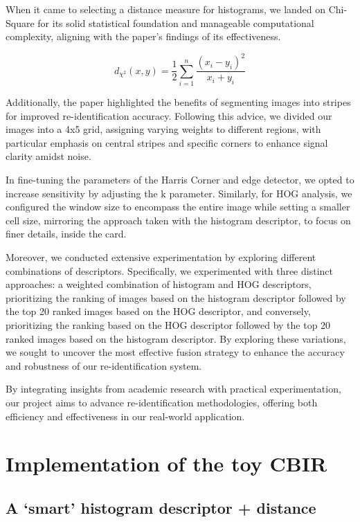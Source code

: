 \documentclass[12pt]{article}
\begin{document}
When it came to selecting a distance measure for histograms, we landed on Chi-Square for its solid statistical foundation and manageable computational complexity, aligning with the paper's findings of its effectiveness.

\begin{equation*}
    d_{\chi^2}(x, y) = \frac{1}{2}\sum_{i = 1}^n \frac{\left(x_i - y_i\right)^2}{x_i + y_i}
\end{equation*}

Additionally, the paper highlighted the benefits of segmenting images into stripes for improved re-identification accuracy. Following this advice, we divided our images into a 4x5 grid, assigning varying weights to different regions, with particular emphasis on central stripes and specific corners to enhance signal clarity amidst noise.

In fine-tuning the parameters of the Harris Corner and edge detector, we opted to increase sensitivity by adjusting the k parameter. Similarly, for HOG analysis, we configured the window size to encompass the entire image while setting a smaller cell size, mirroring the approach taken with the histogram descriptor, to focus on finer details, inside the card.

Moreover, we conducted extensive experimentation by exploring different combinations of descriptors. Specifically, we experimented with three distinct approaches: a weighted combination of histogram and HOG descriptors, prioritizing the ranking of images based on the histogram descriptor followed by the top 20 ranked images based on the HOG descriptor, and conversely, prioritizing the ranking based on the HOG descriptor followed by the top 20 ranked images based on the histogram descriptor. By exploring these variations, we sought to uncover the most effective fusion strategy to enhance the accuracy and robustness of our re-identification system.

By integrating insights from academic research with practical experimentation, our project aims to advance re-identification methodologies, offering both efficiency and effectiveness in our real-world application.

\section{Implementation of the toy CBIR}

\subsection{A `smart' histogram descriptor + distance}
\end{document}
